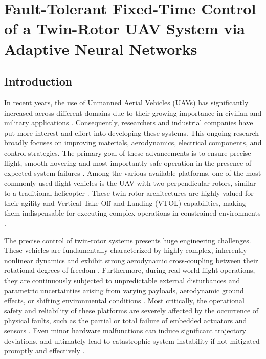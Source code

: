 
\chapter{Fault-Tolerant Fixed-Time Control of a Twin-Rotor UAV System via Adaptive Neural Networks}
\label{chp3}


\section{Introduction}

In recent years, the use of Unmanned Aerial Vehicles (UAVs) has significantly increased across different domains due to their growing importance in civilian and military applications \cite{UAV_rev, UAV_rev1, Valavanis2015}. Consequently, researchers and industrial companies have put more interest and effort into developing these systems. This ongoing research broadly focuses on improving materials, aerodynamics, electrical components, and control strategies. The primary goal of these advancements is to ensure precise flight, smooth hovering and most importantly safe operation in the presence of expected system failures \cite{Steinberg2021, Zhang2008}. Among the various available platforms, one of the most commonly used flight vehicles is the UAV with two perpendicular rotors, similar to a traditional helicopter \cite{trms_review1, Rahideh2008, chelihi2014mrac}. These twin-rotor architectures are highly valued for their agility and Vertical Take-Off and Landing (VTOL) capabilities, making them indispensable for executing complex operations in constrained environments \cite{trms1}.

The precise control of twin-rotor systems presents huge engineering challenges. These vehicles are fundamentally characterized by highly complex, inherently nonlinear dynamics and exhibit strong aerodynamic cross-coupling between their rotational degrees of freedom \cite{NonlinearCoupledDynamics1, trms2}. Furthermore, during real-world flight operations, they are continuously subjected to unpredictable external disturbances and parametric uncertainties arising from varying payloads, aerodynamic ground effects, or shifting environmental conditions \cite{ExternalDisturbances1, ExternalDisturbances2}. Most critically, the operational safety and reliability of these platforms are severely affected by the occurrence of physical faults, such as the partial or total failure of embedded actuators and sensors \cite{Isermann2011, ftc_UAV_review2}. Even minor hardware malfunctions can induce significant trajectory deviations, and ultimately lead to catastrophic system instability if not mitigated promptly and effectively \cite{Steinberg2021, Zhang2008}.

